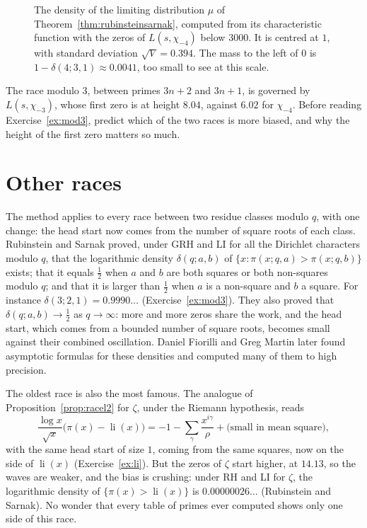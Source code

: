 \begin{figure}[ht]
\centering{}
\caption{The density of the limiting distribution $\mu$ of Theorem~\ref{thm:rubinsteinsarnak}, computed from its characteristic function with the zeros of $L(s,\chi_{-4})$ below $3000$. It is centred at $1$, with standard deviation $\sqrt V=0.394$. The mass to the left of $0$ is $1-\delta(4;3,1)\approx0.0041$, too small to see at this scale.}
\label{fig:biasdensity}
\end{figure}

\begin{think}
The race modulo $3$, between primes $3n+2$ and $3n+1$, is governed by $L(s,\chi_{-3})$, whose first zero is at height $8.04$, against $6.02$ for $\chi_{-4}$. Before reading Exercise~\ref{ex:mod3}, predict which of the two races is more biased, and why the height of the first zero matters so much.
\end{think}

\section{Other races}

The method applies to every race between two residue classes modulo $q$, with one change: the head start now comes from the number of square roots of each class. Rubinstein and Sarnak proved, under GRH and LI for all the Dirichlet characters modulo $q$, that the logarithmic density $\delta(q;a,b)$ of $\{x:\pi(x;q,a)>\pi(x;q,b)\}$ exists; that it equals $\frac12$ when $a$ and $b$ are both squares or both non-squares modulo $q$; and that it is larger than $\frac12$ when $a$ is a non-square and $b$ a square. For instance $\delta(3;2,1)=0.9990\ldots$ (Exercise~\ref{ex:mod3}). They also proved that $\delta(q;a,b)\to\frac12$ as $q\to\infty$: more and more zeros share the work, and the head start, which comes from a bounded number of square roots, becomes small against their combined oscillation. Daniel Fiorilli and Greg Martin later found asymptotic formulas for these densities and computed many of them to high precision.

The oldest race is also the most famous. The analogue of Proposition~\ref{prop:racel2} for $\zeta$, under the Riemann hypothesis, reads
\[
\frac{\log x}{\sqrt x}\bigl(\pi(x)-\operatorname{li}(x)\bigr)=-1-\sum_\gamma\frac{x^{i\gamma}}\rho+\text{(small in mean square)},
\]
with the same head start of size $1$, coming from the same squares, now on the side of $\operatorname{li}(x)$ (Exercise~\ref{ex:li}). But the zeros of $\zeta$ start higher, at $14.13$, so the waves are weaker, and the bias is crushing: under RH and LI for $\zeta$, the logarithmic density of $\{\pi(x)>\operatorname{li}(x)\}$ is $0.00000026\ldots$ (Rubinstein and Sarnak). No wonder that every table of primes ever computed shows only one side of this race.

